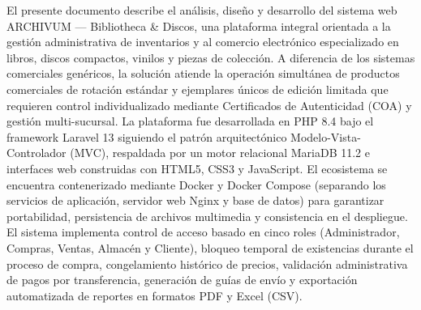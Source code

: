 \begin{resumen}
El presente documento describe el análisis, diseño y desarrollo del sistema web ARCHIVUM — Bibliotheca \& Discos, una plataforma integral orientada a la gestión administrativa de inventarios y al comercio electrónico especializado en libros, discos compactos, vinilos y piezas de colección. A diferencia de los sistemas comerciales genéricos, la solución atiende la operación simultánea de productos comerciales de rotación estándar y ejemplares únicos de edición limitada que requieren control individualizado mediante Certificados de Autenticidad (COA) y gestión multi-sucursal.
La plataforma fue desarrollada en PHP 8.4 bajo el framework Laravel 13 siguiendo el patrón arquitectónico Modelo-Vista-Controlador (MVC), respaldada por un motor relacional MariaDB 11.2 e interfaces web construidas con HTML5, CSS3 y JavaScript. El ecosistema se encuentra contenerizado mediante Docker y Docker Compose (separando los servicios de aplicación, servidor web Nginx y base de datos) para garantizar portabilidad, persistencia de archivos multimedia y consistencia en el despliegue. El sistema implementa control de acceso basado en cinco roles (Administrador, Compras, Ventas, Almacén y Cliente), bloqueo temporal de existencias durante el proceso de compra, congelamiento histórico de precios, validación administrativa de pagos por transferencia, generación de guías de envío y exportación automatizada de reportes en formatos PDF y Excel (CSV).

\end{resumen}
